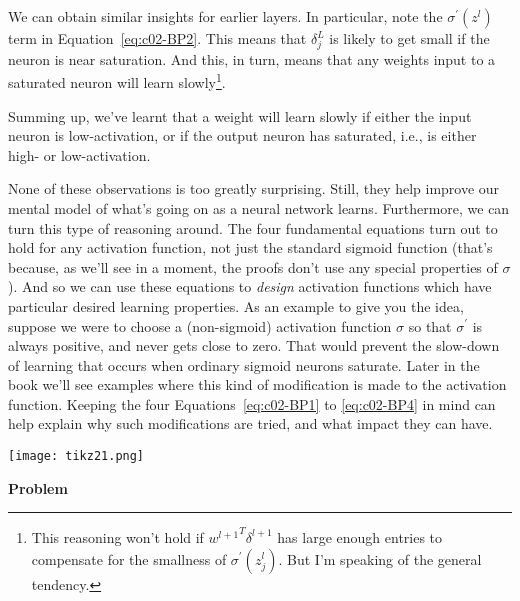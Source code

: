We can obtain similar insights for earlier layers. In particular, note the $\sigma^{\prime}\left(z^{l}\right)$
term in Equation~\ref{eq:c02-BP2}. This means that $\delta_{j}^{L}$ is likely to get small if the neuron is near saturation. And this, in turn, means that any weights input to a saturated neuron will learn slowly\footnote{This reasoning won't hold if ${w^{l+1}}^T\delta^{l+1}$ has large enough entries to compensate for the smallness of $\sigma^\prime(z^l_j)$. But I'm speaking of the general tendency.}.

Summing up, we've learnt that a weight will learn slowly if either the input neuron is low-activation, or if the output neuron has saturated, i.e., is either high- or low-activation. 

None of these observations is too greatly surprising. Still, they help improve our mental model of what's going on as a neural network learns. Furthermore, we can turn this type of reasoning around. The four fundamental equations turn out to hold for any activation function, not just the standard sigmoid function (that's because, as we'll see in a moment, the proofs don't use any special properties of $\sigma$). And so we can use these equations to \textit{design} activation functions which have particular desired learning properties. As an example to give you the idea, suppose we were to choose a (non-sigmoid) activation function $\sigma$ so that  $\sigma^\prime$ is always positive, and never gets close to zero. That would prevent the slow-down of learning that occurs when ordinary sigmoid neurons saturate. Later in the book we'll see examples where this kind of modification is made to the activation function. Keeping the four Equations~\ref{eq:c02-BP1} to \ref{eq:c02-BP4} in mind can help explain why such modifications are tried, and what impact they can have.

{\centering \texttt{[image: tikz21.png]} \par}

\textbf{Problem}

